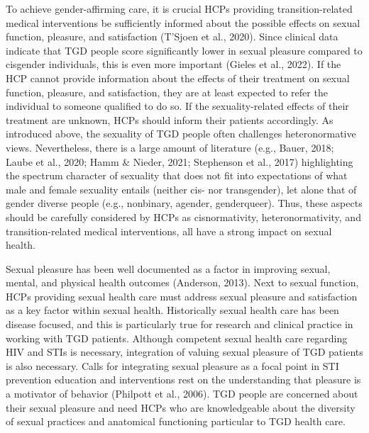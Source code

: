 \documentclass[
]{book}
\begin{document}
To achieve gender-affirming care, it is crucial
HCPs providing transition-related medical interventions be sufficiently informed about the possible effects on sexual function, pleasure, and
satisfaction (T'Sjoen et al., 2020). Since clinical
data indicate that TGD people score significantly
lower in sexual pleasure compared to cisgender
individuals, this is even more important (Gieles
et al., 2022). If the HCP cannot provide information about the effects of their treatment on
sexual function, pleasure, and satisfaction, they
are at least expected to refer the individual to
someone qualified to do so. If the sexuality-related
effects of their treatment are unknown, HCPs
should inform their patients accordingly. As
introduced above, the sexuality of TGD people
often challenges heteronormative views.
Nevertheless, there is a large amount of literature
(e.g., Bauer, 2018; Laube et al., 2020; Hamm \&
Nieder, 2021; Stephenson et al., 2017) highlighting the spectrum character of sexuality that does
not fit into expectations of what male and female
sexuality entails (neither cis- nor transgender),
let alone that of gender diverse people (e.g., nonbinary, agender, genderqueer). Thus, these aspects
should be carefully considered by HCPs as
cisnormativity, heteronormativity, and
transition-related medical interventions, all have
a strong impact on sexual health.

Sexual pleasure has been well documented as
a factor in improving sexual, mental, and physical
health outcomes (Anderson, 2013). Next to sexual
function, HCPs providing sexual health care must
address sexual pleasure and satisfaction as a key
factor within sexual health. Historically sexual
health care has been disease focused, and this is
particularly true for research and clinical practice
in working with TGD patients. Although competent sexual health care regarding HIV and STIs
is necessary, integration of valuing sexual pleasure
of TGD patients is also necessary. Calls for integrating sexual pleasure as a focal point in STI
prevention education and interventions rest on
the understanding that pleasure is a motivator of
behavior (Philpott et al., 2006). TGD people are
concerned about their sexual pleasure and need
HCPs who are knowledgeable about the diversity
of sexual practices and anatomical functioning
particular to TGD health care.
\end{document}
